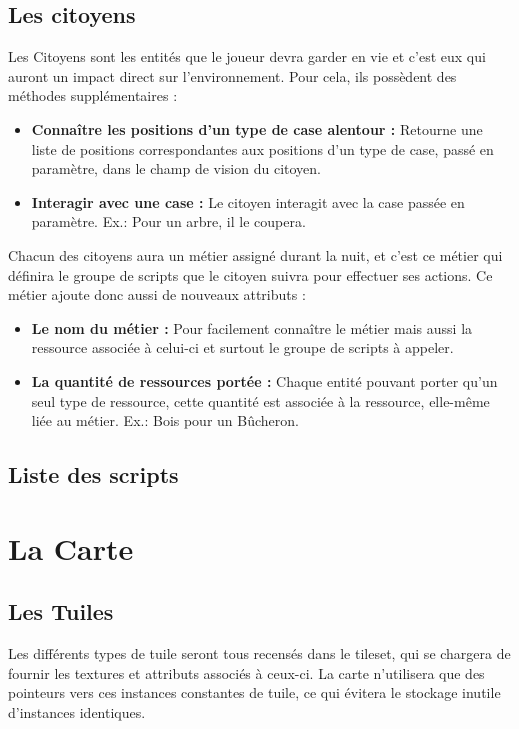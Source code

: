 \documentclass[a4paper]{article}
\newcommand{\alinea}{\hspace*{0.5cm}}
\begin{document}
      \subsection{Les citoyens}
        \alinea Les Citoyens sont les entités que le joueur devra garder en vie et c'est eux qui auront un impact direct sur l'environnement.
        Pour cela, ils possèdent des méthodes supplémentaires :
        \begin{itemize}
          \item \textbf{Connaître les positions d'un type de case alentour : } Retourne une liste de positions correspondantes aux positions d'un type de case, passé en paramètre, dans le champ de vision du citoyen.
          \item \textbf{Interagir avec une case : } Le citoyen interagit avec la case passée en paramètre. Ex.: Pour un arbre, il le coupera.
        \end{itemize}
        \alinea Chacun des citoyens aura un métier assigné durant la nuit, et c'est ce métier qui définira le groupe de scripts que le citoyen suivra pour effectuer ses actions. Ce métier ajoute donc aussi de nouveaux attributs :
        \begin{itemize}
          \item \textbf{Le nom du métier : } Pour facilement connaître le métier mais aussi la ressource associée à celui-ci et surtout le groupe de scripts à appeler.
          \item \textbf{La quantité de ressources portée : } Chaque entité pouvant porter qu'un seul type de ressource, cette quantité est associée à la ressource, elle-même liée au métier. Ex.: Bois pour un Bûcheron.
        \end{itemize}
        
      \subsection{Liste des scripts}
      
    \section{La Carte}
      \subsection{Les Tuiles}
        \alinea Les différents types de tuile seront tous recensés dans le tileset, qui se chargera de fournir les textures et attributs associés à ceux-ci. La carte n'utilisera que des pointeurs vers ces instances constantes de tuile, ce  qui évitera le stockage inutile d'instances identiques.
        
\end{document}
